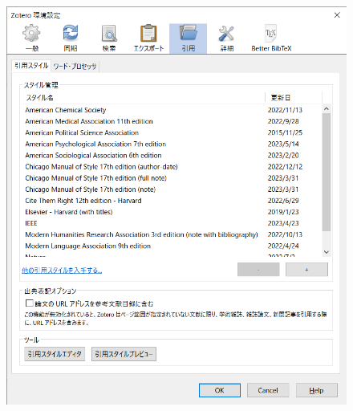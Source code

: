 \documentclass[a4paper,pdftex]{article}
\begin{document}
\begin{figure}[ht]
\begin{minipage}[ht]{0.19\columnwidth}
  \end{minipage}
  \begin{minipage}[ht]{0.19\columnwidth}
    \centering
    \includegraphics[width=\columnwidth]{fig/zotero05.png}
  \end{minipage}
  \\
  \begin{minipage}[ht]{0.19\columnwidth}
    \centering

\end{minipage}
\end{figure}
\end{document}
